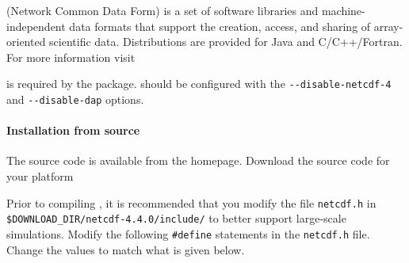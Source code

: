 % 
%               
%          
% 

\levelstay{\texorpdfstring{\protect\marktool{\netcdfname{}}}{\netcdfname{}}}
\label{sec:Install_netcdf}

\marktool{\netcdfname} (Network Common Data Form) is a set of software libraries and machine-independent data formats that support the creation, access, and sharing of array-oriented scientific data. Distributions are provided for Java and C/C++/Fortran. For more information visit

\href{\netcdfaddress}{\netcdfaddress}

\marktool{\netcdfname} is required by the \marktool{\trilinosname}  package. \marktool{\netcdfname} should be configured with the \verb+--disable-netcdf-4+ and \verb+--disable-dap+ options.

\paragraph{Installation from source} The \marktool{\netcdfname} source code is available from the \marktool[\netcdfaddress]{\netcdfname} homepage. Download the source code for your platform

\begingroup
\lstset{breaklines=true}
\endgroup

Prior to compiling \marktool{\netcdfname}, it is recommended that you modify the file \verb+netcdf.h+ in \\\verb+$DOWNLOAD_DIR/netcdf-4.4.0/include/+ to better support large-scale \marktool{\toolname} simulations. Modify the following \verb+#define+ statements in the \verb+netcdf.h+ file. Change the values to match what is given below.

